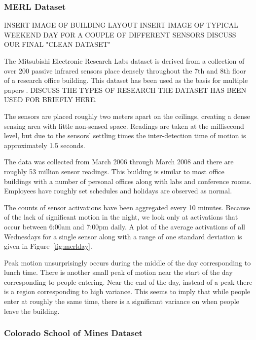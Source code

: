 \subsubsection{MERL Dataset} 

INSERT IMAGE OF BUILDING LAYOUT
INSERT IMAGE OF TYPICAL WEEKEND DAY  FOR A COUPLE OF DIFFERENT SENSORS
DISCUSS OUR FINAL "CLEAN DATASET"

The Mitsubishi Electronic Research Labs dataset is derived from a collection of over 200 passive infrared sensors place densely throughout the 7th and 8th floor of a research office building.  This dataset has been used as the basis for multiple papers \cite{Wren2003, Wren2006, Wren2007a, Dong2011, Minnen2004, Wren2006a, Wren2007}.  DISCUSS THE TYPES OF RESEARCH THE DATASET HAS BEEN USED FOR BRIEFLY HERE.

The sensors are placed roughly two meters apart on the ceilings, creating a dense sensing area with little non-sensed space.  Readings are taken at the millisecond level, but due to the sensors' settling times the inter-detection time of motion is approximately 1.5 seconds.

The data was collected from March 2006 through March 2008 and there are roughly 53 million sensor readings.  This building is similar to most office buildings with a number of personal offices along with labs and conference rooms.  Employees have roughly set schedules and holidays are observed as normal. 

The counts of sensor activations have been aggregated every 10 minutes.  Because of the lack of significant motion in the night, we look only at activations that occur between 6:00am and 7:00pm daily.  A plot of the average activations of all Wednesdays for a single sensor along with a range of one standard deviation is given in Figure~\ref{fig:merlday}.  

Peak motion unsurprisingly occurs during the middle of the day corresponding to lunch time.  There is another small peak of motion near the start of the day corresponding to people entering.  Near the end of the day, instead of a peak there is a region corresponding to high variance.  This seems to imply that while people enter at roughly the same time, there is a significant variance on when people leave the building.


\subsubsection{Colorado School of Mines Dataset}

